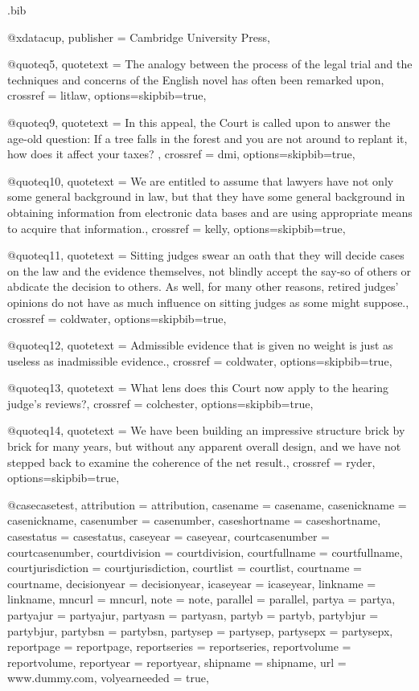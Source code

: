 

\begin{filecontents*}[overwrite]{\jobname.bib}


@xdata{cup,	publisher =  {Cambridge University Press},												}

@quote{q5,	quotetext =  {The analogy between the process of the legal trial and the techniques and concerns of the English novel has often been remarked upon},	crossref =  {litlaw},				options={skipbib=true},}

@quote{q9,	quotetext =  { In this appeal, the Court is called upon to answer the age-old question:  If a tree falls in the forest and you are not around to replant it, how does it affect your taxes? },	crossref =  {dmi},				options={skipbib=true},}

@quote{q10,	quotetext =  {We are entitled to assume that lawyers have not only some general background in law, but that they have some general background in obtaining information from electronic data bases and are using appropriate means to acquire that information.},	crossref =  {kelly},				options={skipbib=true},}

@quote{q11,	quotetext =  {Sitting judges swear an oath that they will decide cases on the law and the evidence themselves, not blindly accept the say-so of others or abdicate the decision to others. As well, for many other reasons, retired judges’ opinions do not have as much influence on sitting judges as some might suppose.},	crossref =  {coldwater},				options={skipbib=true},}

@quote{q12,	quotetext =  {Admissible evidence that is given no weight is just as useless as inadmissible evidence.},	crossref =  {coldwater},				options={skipbib=true},}

@quote{q13,	quotetext =  {What lens does this Court now apply to the hearing judge’s reviews?},	crossref =  {colchester},				options={skipbib=true},}

@quote{q14,	quotetext =  {We have been building an impressive structure brick by brick for many years, but without any apparent overall design, and we have not stepped back to examine the coherence of the net result.},	crossref =  {ryder},				options={skipbib=true},}


@case{casetest,
attribution = {attribution},
casename = {casename},
casenickname = {casenickname},
casenumber = {casenumber},
caseshortname = {caseshortname},
casestatus = {casestatus},
caseyear = {caseyear},
courtcasenumber = {courtcasenumber},
courtdivision = {courtdivision},
courtfullname = {courtfullname},
courtjurisdiction = {courtjurisdiction},
courtlist = {courtlist},
courtname = {courtname},
decisionyear = {decisionyear},
icaseyear = {icaseyear},
linkname = {linkname},
mncurl = {mncurl},
note = {note},
parallel = {parallel},
partya = {partya},
partyajur = {partyajur},
partyasn = {partyasn},
partyb = {partyb},
partybjur = {partybjur},
partybsn = {partybsn},
partysep = {partysep},
partysepx = {partysepx},
reportpage = {reportpage},
reportseries = {reportseries},
reportvolume = {reportvolume},
reportyear = {reportyear},
shipname = {shipname},
url = {www.dummy.com},
volyearneeded = {true},
}


\end{filecontents*}
